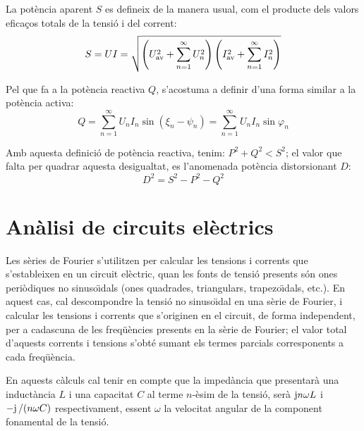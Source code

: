 La pot\`{e}ncia aparent $S$ es defineix de la manera usual, com el
producte dels valors efica\c{c}os totals de la tensi\'{o} i del corrent:
\begin{equation}
    S = U I = \sqrt{ \left(U_\mathrm{av}^2 + \sum_{n=1}^{\infty}U^2_n\right)
    \left(I_\mathrm{av}^2 + \sum_{n=1}^{\infty}I^2_n\right) }
\end{equation}

Pel que fa  a la pot\`{e}ncia reactiva $Q$, s'acostuma  a definir d'una
forma similar a la pot\`{e}ncia activa:
\begin{equation}
    Q = \sum_{n=1}^\infty U_n I_n
    \sin(\xi_n-\psi_n) =  \sum_{n=1}^\infty U_n I_n
    \sin \varphi_n
\end{equation}

Amb aquesta definici\'{o} de pot\`{e}ncia reactiva, tenim: $P^2+Q^2 < S^2$;
el valor que falta per quadrar aquesta desigualtat, es l'anomenada
pot\`{e}ncia distorsionant $D$:
\begin{equation}
    D^2 = S^2 - P^2 - Q^2
\end{equation}

\section{An\`{a}lisi de circuits el\`{e}ctrics}

Les s\`{e}ries de Fourier s'utilitzen per calcular les tensions i
corrents que s'estableixen en un circuit el\`{e}ctric, quan les fonts de
tensi\'{o} presents  s\'{o}n ones peri\`{o}diques no sinuso\"{\i}dals (ones
quadrades, triangulars, trapezo\"{\i}dals, etc.). En aquest cas, cal
descompondre la tensi\'{o} no sinuso\"{\i}dal en una s\`{e}rie de Fourier, i
calcular les tensions i corrents que s'originen en el circuit, de
forma independent, per a cadascuna de les freq\"{u}\`{e}ncies presents en la
s\`{e}rie de Fourier; el valor total d'aquests corrents i tensions
s'obt\'{e} sumant els termes parcials corresponents a cada freq\"{u}\`{e}ncia.

En aquests c\`{a}lculs cal tenir en compte que la imped\`{a}ncia que
presentar\`{a} una induct\`{a}ncia $L$ i una capacitat $C$ al terme
$n$-\`{e}sim de la tensi\'{o}, ser\`{a} $\mathrm{j} n \omega L$ i $-\mathrm{j}\,/(n\omega C)$
respectivament, essent $\omega$ la velocitat angular de la component
fonamental de la tensi\'{o}.

